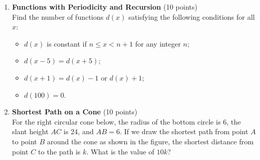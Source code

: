 \begin{enumerate}
  \item \textbf{Functions with Periodicity and Recursion} (10 points)\\
  Find the number of functions $d(x)$ satisfying the following conditions for all $x$:
  \begin{itemize}
    \item $d(x)$ is constant if $n \leq x < n+1$ for any integer $n$;
    \item $d(x-5)=d(x+5)$;
    \item $d(x+1)=d(x)-1$ or $d(x)+1$;
    \item $d(100)=0$.
  \end{itemize}
  \begin{subanswer}
  \end{subanswer}

  \newpage

  \item \textbf{Shortest Path on a Cone} (10 points)\\
  For the right circular cone below, the radius of the bottom circle is 6, 
  the slant height $AC$ is 24, and $AB=6$. If we draw the shortest path 
  from point $A$ to point $B$ around the cone as shown in the figure, the 
  shortest distance from point $C$ to the path is $k$. What is the value 
  of $10k$?


  \begin{subanswer}
  \end{subanswer}

\end{enumerate}

